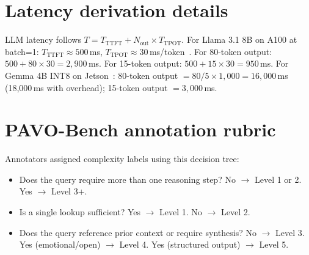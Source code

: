 \documentclass{article}
\begin{document}
\section{Latency derivation details}
\label{app:latency}

LLM latency follows $T = T_{\text{TTFT}} + N_{\text{out}}\times T_{\text{TPOT}}$. For Llama 3.1 8B on A100 at batch=1: $T_{\text{TTFT}}\approx500$\,ms, $T_{\text{TPOT}}\approx30$\,ms/token~\citep{mlperf2025}. For 80-token output: $500+80\times30=2{,}900$\,ms. For 15-token output: $500+15\times30=950$\,ms. For Gemma 4B INT8 on Jetson~\citep{song2023powerinfer}: 80-token output $=80/5\times1{,}000=16{,}000$\,ms (18{,}000\,ms with overhead); 15-token output $=3{,}000$\,ms.

\section{PAVO-Bench annotation rubric}
\label{app:rubric}

Annotators assigned complexity labels using this decision tree:
\begin{itemize}[leftmargin=*,itemsep=1pt]
  \item Does the query require more than one reasoning step? No $\to$ Level 1 or 2. Yes $\to$ Level 3+.
  \item Is a single lookup sufficient? Yes $\to$ Level 1. No $\to$ Level 2.
  \item Does the query reference prior context or require synthesis? No $\to$ Level 3. Yes (emotional/open) $\to$ Level 4. Yes (structured output) $\to$ Level 5.
\end{itemize}
\end{document}
